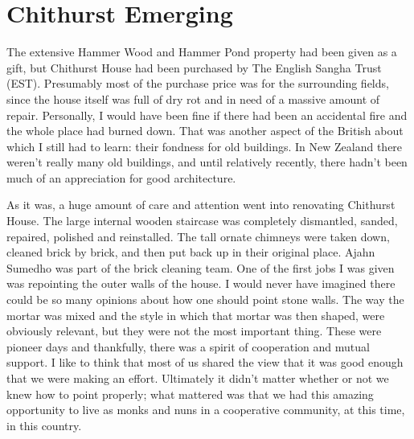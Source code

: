 \chapter{Chithurst Emerging}

The extensive Hammer Wood and Hammer Pond property had been given as a
gift, but Chithurst House had been purchased by The English Sangha Trust
(EST). Presumably most of the purchase price was for the surrounding
fields, since the house itself was full of dry rot and in need of a
massive amount of repair. Personally, I would have been fine if there
had been an accidental fire and the whole place had burned down. That
was another aspect of the British about which I still had to learn:
their fondness for old buildings. In New Zealand there weren't really
many old buildings, and until relatively recently, there hadn't been
much of an appreciation for good architecture.

As it was, a huge amount of care and attention went into renovating
Chithurst House. The large internal wooden staircase was completely
dismantled, sanded, repaired, polished and reinstalled. The tall ornate
chimneys were taken down, cleaned brick by brick, and then put back up
in their original place. Ajahn Sumedho was part of the brick cleaning
team. One of the first jobs I was given was repointing the outer walls
of the house. I would never have imagined there could be so many
opinions about how one should point stone walls. The way the mortar was
mixed and the style in which that mortar was then shaped, were obviously
relevant, but they were not the most important thing. These were pioneer
days and thankfully, there was a spirit of cooperation and mutual
support. I like to think that most of us shared the view that it was good enough that we
were making an effort. Ultimately it didn't matter whether or not we
knew how to point properly; what mattered was that we had this amazing
opportunity to live as monks and nuns in a cooperative community, at
this time, in this country.

